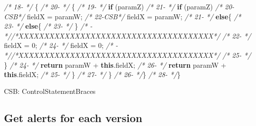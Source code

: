 \documentclass[
]{article}
\newenvironment{Shaded}{\begin{snugshade}}{\end{snugshade}}
\newcommand{\CommentTok}[1]{\textcolor[rgb]{0.56,0.35,0.01}{\textit{#1}}}
\newcommand{\DecValTok}[1]{\textcolor[rgb]{0.00,0.00,0.81}{#1}}
\newcommand{\FunctionTok}[1]{\textcolor[rgb]{0.00,0.00,0.00}{#1}}
\newcommand{\KeywordTok}[1]{\textcolor[rgb]{0.13,0.29,0.53}{\textbf{#1}}}
\newcommand{\NormalTok}[1]{#1}
\begin{document}
\begin{Shaded}
\begin{Highlighting}[]
\CommentTok{/* 18{-}   */}\NormalTok{    \{                                                    }\CommentTok{/* 20{-}   */}\NormalTok{    \{                                                    }
\CommentTok{/* 19{-}   */}        \KeywordTok{if}\NormalTok{ (paramZ)                                      }\CommentTok{/* 21{-}   */}        \KeywordTok{if}\NormalTok{ (paramZ)                                      }
\CommentTok{/* 20{-}CSB*/}\NormalTok{            fieldX = paramW;                             }\CommentTok{/* 22{-}CSB*/}\NormalTok{            fieldX = paramW;                             }
\CommentTok{/* 21{-}   */}        \KeywordTok{else}\NormalTok{\{                                            }\CommentTok{/* 23{-}   */}        \KeywordTok{else}\NormalTok{\{                                            }
\CommentTok{/* 23{-}   */}\NormalTok{     \}                                                        }\CommentTok{/*   {-}   *//*XXXXXXXXXXXXXXXXXXXXXXXXXXXXXXXXXXXXXX*/}               
\CommentTok{/* 22{-}   */}\NormalTok{            fieldX = }\DecValTok{0}\NormalTok{;                                  }\CommentTok{/* 24{-}   */}\NormalTok{            fieldX = }\DecValTok{0}\NormalTok{;                                  }
\CommentTok{/*   {-}   *//*XXXXXXXXXXXXXXXXXXXXXXXXXXXXXXXXXXXXXX*/}               \CommentTok{/* 25{-}   */}\NormalTok{        \}                                                }
\CommentTok{/* 24{-}   */}        \KeywordTok{return}\NormalTok{ paramW + }\KeywordTok{this}\NormalTok{.}\FunctionTok{fieldX}\NormalTok{;                     }\CommentTok{/* 26{-}   */}        \KeywordTok{return}\NormalTok{ paramW + }\KeywordTok{this}\NormalTok{.}\FunctionTok{fieldX}\NormalTok{;                     }
\CommentTok{/* 25{-}   */}\NormalTok{     \}                                                   }\CommentTok{/* 27{-}   */}\NormalTok{     \}                                                   }
\CommentTok{/* 26{-}   */}\NormalTok{\}                                                        }\CommentTok{/* 28{-}   */}\NormalTok{\}                                                        }


\NormalTok{CSB: ControlStatementBraces}
\end{Highlighting}
\end{Shaded}

\normalsize

\subsection{Get alerts for each version}
\end{document}
